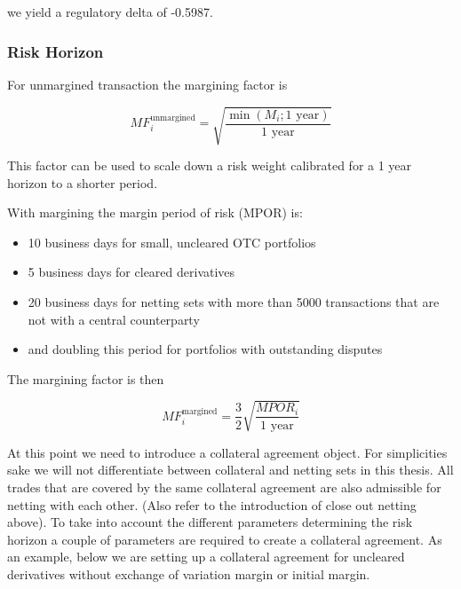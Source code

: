     we yield a regulatory delta of -0.5987.

    
    \hypertarget{risk-horizon}{%
\subsubsection{Risk Horizon}\label{risk-horizon}}

For unmargined transaction the margining factor is

\[MF^{\text{unmargined}}_i = \sqrt{\frac{\min\left(M_i;1\text{ year}\right)}{1\text{ year}}}\]

This factor can be used to scale down a risk weight calibrated for a 1
year horizon to a shorter period.

With margining the margin period of risk (MPOR) is:

\begin{itemize}
\tightlist
\item
  10 business days for small, uncleared OTC portfolios
\item
  5 business days for cleared derivatives
\item
  20 business days for netting sets with more than 5000 transactions
  that are not with a central counterparty
\item
  and doubling this period for portfolios with outstanding disputes
\end{itemize}

The margining factor is then

\[ MF^{\text{margined}}_i = \frac{3}{2}\sqrt{\frac{MPOR_i}{1\text{ year}}} \]

At this point we need to introduce a collateral agreement object. For
simplicities sake we will not differentiate between collateral and
netting sets in this thesis. All trades that are covered by the same
collateral agreement are also admissible for netting with each other.
(Also refer to the introduction of close out netting above). To take
into account the different parameters determining the risk horizon a
couple of parameters are required to create a collateral agreement. As
an example, below we are setting up a collateral agreement for uncleared
derivatives without exchange of variation margin or initial margin.

